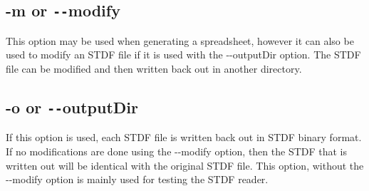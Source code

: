 \documentclass[letterpaper]{article}
\begin{document}
\subsection{\bf -m or \texttt{-{}-}modify}
This option may be used when generating a spreadsheet, however it can also
be used to modify an STDF file if it is used with the -{}-outputDir option.
The STDF file can be modified and then written back out in another directory.

\subsection{\bf -o or \texttt{-{}-}outputDir}
If this option is used, each STDF file is written back out in STDF binary format.
If no modifications are done using the -{}-modify option, then the STDF that
is written out will be identical with the original STDF file.  This option,
without the -{}-modify option is mainly used for testing the STDF reader.
\clearpage
\end{document}
